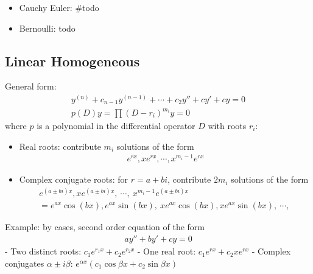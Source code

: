 \begin{itemize}
  \begin{itemize}
  \tightlist
  \item
    \(M(x,y)dx + N(x,y)dy = 0 \text{ is exact } \iff \exists \phi: \frac{\partial\phi}{\partial x} = M(x, y),~\frac{\partial\phi}{\partial y} = N(x, y) \\ \iff \frac{\partial M}{\partial y} = \frac{\partial N}{x}\)
  \item
    General solution:
    \begin{align*}\phi(x, y) = \int^x M(s, y) ds + \int^y N(x, t) dt - \int^y \frac{\partial}{\partial t} \left(\int^x M(s, t) ds\right)dt\end{align*}
    (where \(\int^x f(t) dt\) means take the antiderivative of \(f\) and
    consider it a function of \(x\))
  \end{itemize}
\item
  Cauchy Euler: \#todo
\item
  Bernoulli: todo
\end{itemize}

\hypertarget{linear-homogeneous}{%
\subsection{Linear Homogeneous}\label{linear-homogeneous}}

General form:
\begin{align*}
y^{(n)} + c_{n-1} y^{(n-1)} + \cdots + c_2y'' + cy' + cy = 0 \\
p(D)y = \prod (D-r_i)^{m_i} y= 0
\end{align*} where \(p\) is a polynomial in the differential operator
\(D\) with roots \(r_i\):

\begin{itemize}
\item
  Real roots: contribute \(m_i\) solutions of the form
  \begin{align*}e^{rx}, xe^{rx}, \cdots, x^{m_i-1}e^{rx}\end{align*}
\item
  Complex conjugate roots: for \(r=a+bi\), contribute \(2m_i\) solutions
  of the form
  \begin{align*}e^{(a\pm bi)x}, xe^{(a\pm bi)x}, ~\cdots,~ x^{m_i-1}e^{(a\pm bi)x} \\
    = e^{ax}\cos(bx), e^{ax}\sin(bx),~ xe^{ax}\cos(bx), xe^{ax}\sin(bx),~ \cdots,~
    \end{align*}
\end{itemize}

Example: by cases, second order equation of the form
\begin{align*}ay'' + by' + cy = 0\end{align*} - Two distinct roots:
\(c_1 e^{r_1 x} + c_2 e^{r_2 x}\) - One real root:
\(c_1 e^{rx} + c_2 x e^{rx}\) - Complex conjugates
\(\alpha \pm i \beta\):
\(e^{\alpha x}(c_1 \cos \beta x + c_2 \sin \beta x)\)

